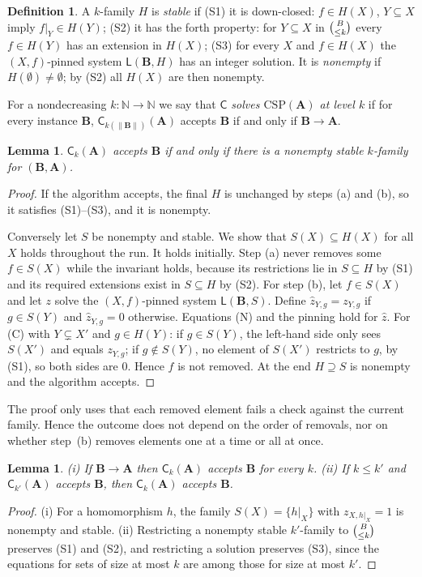 \documentclass[11pt]{article}
\newtheorem{lemma}[theorem]{Lemma}
\theoremstyle{definition}
\newtheorem{definition}[theorem]{Definition}
\theoremstyle{remark}
\newcommand{\Csp}{\mathrm{CSP}}
\newcommand{\Coh}{\mathsf{C}}
\newcommand{\sub}[2]{\tbinom{#1}{\le #2}}
\newcommand{\size}[1]{\lVert #1\rVert}
\begin{document}
\begin{definition}
A $k$-family $H$ is \emph{stable} if
(S1) it is down-closed: $f\in H(X)$, $Y\subseteq X$ imply $f|_Y\in H(Y)$;
(S2) it has the forth property: for $Y\subseteq X$ in $\sub Bk$ every
$f\in H(Y)$ has an extension in $H(X)$;
(S3) for every $X$ and $f\in H(X)$ the $(X,f)$-pinned system
$\mathsf L(\mathbf B,H)$ has an integer solution.
It is \emph{nonempty} if $H(\emptyset)\neq\emptyset$; by (S2) all $H(X)$ are
then nonempty.
\end{definition}

For a nondecreasing $k\colon\mathbb N\to\mathbb N$ we say that
\emph{$\Coh$ solves $\Csp(\mathbf A)$ at level $k$} if for every instance
$\mathbf B$, $\Coh_{k(\size{\mathbf B})}(\mathbf A)$ accepts $\mathbf B$ if
and only if $\mathbf B\to\mathbf A$.

\begin{lemma}\label{lem:stable}
$\Coh_k(\mathbf A)$ accepts $\mathbf B$ if and only if there is a nonempty
stable $k$-family for $(\mathbf B,\mathbf A)$.
\end{lemma}
\begin{proof}
If the algorithm accepts, the final $H$ is unchanged by steps (a) and (b), so
it satisfies (S1)--(S3), and it is nonempty.

Conversely let $S$ be nonempty and stable. We show that $S(X)\subseteq H(X)$
for all $X$ holds throughout the run. It holds initially. Step (a) never
removes some $f\in S(X)$ while the invariant holds, because its restrictions
lie in $S\subseteq H$ by (S1) and its required extensions exist in
$S\subseteq H$ by (S2). For step (b), let $f\in S(X)$ and let $z$ solve the
$(X,f)$-pinned system $\mathsf L(\mathbf B,S)$. Define $\hat z_{Y,g}=z_{Y,g}$
if $g\in S(Y)$ and $\hat z_{Y,g}=0$ otherwise. Equations (N) and the pinning
hold for $\hat z$. For (C) with $Y\subsetneq X'$ and $g\in H(Y)$: if
$g\in S(Y)$, the left-hand side only sees $S(X')$ and equals $z_{Y,g}$; if
$g\notin S(Y)$, no element of $S(X')$ restricts to $g$, by (S1), so both
sides are $0$. Hence $f$ is not removed. At the end $H\supseteq S$ is
nonempty and the algorithm accepts.
\end{proof}

The proof only uses that each removed element fails a check against the
current family. Hence the outcome does not depend on the order of removals,
nor on whether step~(b) removes elements one at a time or all at once.

\begin{lemma}\label{lem:basic}
(i) If $\mathbf B\to\mathbf A$ then $\Coh_k(\mathbf A)$ accepts $\mathbf B$
for every $k$. (ii) If $k\le k'$ and $\Coh_{k'}(\mathbf A)$ accepts
$\mathbf B$, then $\Coh_k(\mathbf A)$ accepts $\mathbf B$.
\end{lemma}
\begin{proof}
(i) For a homomorphism $h$, the family $S(X)=\{h|_X\}$ with $z_{X,h|_X}=1$ is
nonempty and stable. (ii) Restricting a nonempty stable $k'$-family to
$\sub Bk$ preserves (S1) and (S2), and restricting a solution preserves (S3),
since the equations for sets of size at most $k$ are among those for size at
most $k'$.
\end{proof}
\end{document}
